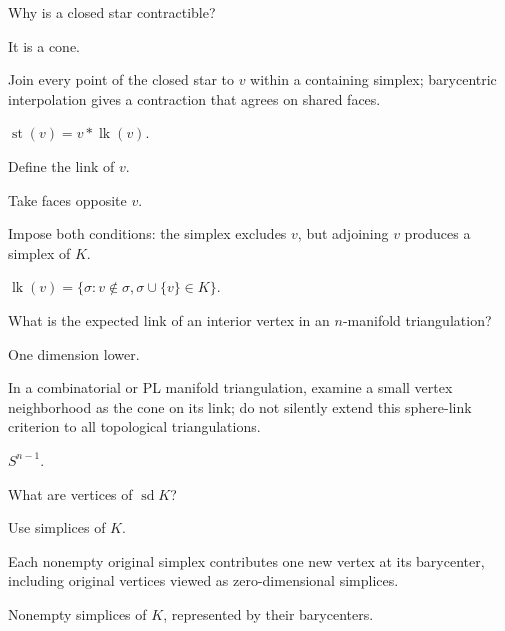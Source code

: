 \begin{exercise}\label{exr:viii15-13}
Why is a closed star contractible?
\end{exercise}
\begin{hint}
It is a cone.

Join every point of the closed star to \(v\) within a containing simplex; barycentric interpolation gives a contraction that agrees on shared faces.
\end{hint}
\begin{solution}
\(\operatorname{st}(v)=v*\operatorname{lk}(v)\).
\end{solution}

\begin{exercise}\label{exr:viii15-14}
Define the link of \(v\).
\end{exercise}
\begin{hint}
Take faces opposite \(v\).

Impose both conditions: the simplex excludes \(v\), but adjoining \(v\) produces a simplex of \(K\).
\end{hint}
\begin{solution}
\(\operatorname{lk}(v)=\{\sigma:v\notin\sigma,\sigma\cup\{v\}\in K\}\).
\end{solution}

\begin{exercise}\label{exr:viii15-15}
What is the expected link of an interior vertex in an \(n\)-manifold triangulation?
\end{exercise}
\begin{hint}
One dimension lower.

In a combinatorial or PL manifold triangulation, examine a small vertex neighborhood as the cone on its link; do not silently extend this sphere-link criterion to all topological triangulations.
\end{hint}
\begin{solution}
\(S^{n-1}\).
\end{solution}

\begin{exercise}\label{exr:viii15-16}
What are vertices of \(\operatorname{sd}K\)?
\end{exercise}
\begin{hint}
Use simplices of \(K\).

Each nonempty original simplex contributes one new vertex at its barycenter, including original vertices viewed as zero-dimensional simplices.
\end{hint}
\begin{solution}
Nonempty simplices of \(K\), represented by their barycenters.
\end{solution}

